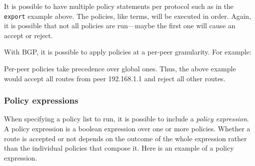 \noindent{}

It is possible to have multiple policy statements per protocol such as in the
{\tt export} example above.  The policies, like terms, will be executed in
order.  Again, it is possible that not all policies are run---maybe the first
one will cause an accept or reject.

With BGP, it is possible to apply policies at a per-peer granularity.  For
example:

\noindent{}

Per-peer policies take precedence over global ones.  Thus, the above example
would accept all routes from peer 192.168.1.1 and reject all other routes.

\subsubsection{Policy expressions}
When specifying a policy list to run, it is possible to include a {\em policy
expression}.  A policy expression is a boolean expression over one or more
policies.  Whether a route is accepted or not depends on the outcome of the
whole expression rather than the individual policies that compose it.  Here is
an example of a policy expression.

